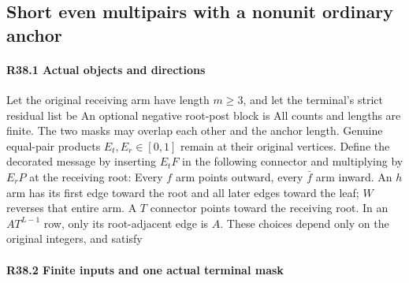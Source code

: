 \subsection{Short even multipairs with a nonunit ordinary anchor}\label{proof:R2-C038}
\paragraph{R38.1 Actual objects and directions}

Let the original receiving arm have length \(m\ge3\), and let the terminal's strict residual list be
An optional negative root-post block is
All counts and lengths are finite. The two masks may overlap each other and the anchor length. Genuine equal-pair products \(E_t,\allowbreak E_r\in[0,\allowbreak 1]\) remain at their original vertices. Define the decorated message by inserting \(E_tF\) in the following connector and multiplying by \(E_rP\) at the receiving root:
Every \(f\) arm points outward, every \(\bar f\) arm inward. An \(h\) arm has its first edge toward the root and all later edges toward the leaf; \(W\) reverses that entire arm. A \(T\) connector points toward the receiving root. In an \(AT^{L-1}\) row, only its root-adjacent edge is \(A\). These choices depend only on the original integers, and satisfy

\paragraph{R38.2 Finite inputs and one actual terminal mask}

